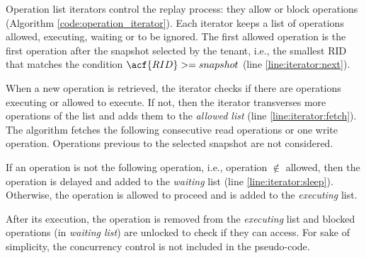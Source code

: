 Operation list iterators control the replay process: they allow or block operations (Algorithm \ref{code:operation_iterator}). Each iterator keeps a list of operations allowed, executing, waiting or to be ignored. The first allowed operation is the first operation after the snapshot selected by the tenant, i.e., the smallest \acf{RID} that matches the condition $\acf{RID} >= snapshot$ (line \ref{line:iterator:next}). 

When a new operation is retrieved, the iterator checks if there are operations executing or allowed to execute. If not, then the iterator transverses more operations of the list and adds them to the \emph{allowed list} (line \ref{line:iterator:fetch}). The algorithm fetches the following consecutive read operations or one write operation. Operations previous to the selected snapshot are not considered.

If an operation is not the following operation, i.e., operation $\notin$ allowed, then the operation is delayed and added to the \emph{waiting} list (line \ref{line:iterator:sleep}). Otherwise, the operation is allowed to proceed and is added to the \emph{executing} list.

After its execution, the operation is removed from the \emph{executing} list and blocked operations (in \emph{waiting list}) are unlocked to check if they can access. For sake of simplicity, the concurrency control is not included in the pseudo-code. \\

